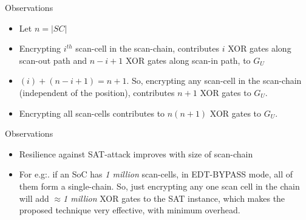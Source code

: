 \begin{frame}{Observations}
\begin{itemize}
\item Let $n=|SC|$
\item Encrypting $i^{th}$ scan-cell in the scan-chain, contributes $i$ XOR gates along scan-out path and $n-i+1$ XOR gates along scan-in path, to $G_U$
\item $(i) + (n-i+1) = n + 1$. So, encrypting any scan-cell in the scan-chain (independent of the position), contributes $n+1$ XOR gates to $G_U$. 
\item Encrypting all scan-cells contributes to $n(n+1)$ XOR gates to $G_U$. 
\end{itemize}
\end{frame}

\begin{frame}{Observations}
\begin{itemize}
\item Resilience against SAT-attack improves with size of scan-chain
\item For e.g:. if an SoC has {\em 1 million} scan-cells, in EDT-BYPASS mode, all of them form a single-chain. So, just encrypting any one scan cell in the chain will add $\approx ${\em 1 million} XOR gates to the SAT instance, which 
	makes the proposed technique very effective, with minimum overhead. 
\end{itemize}
\end{frame}
